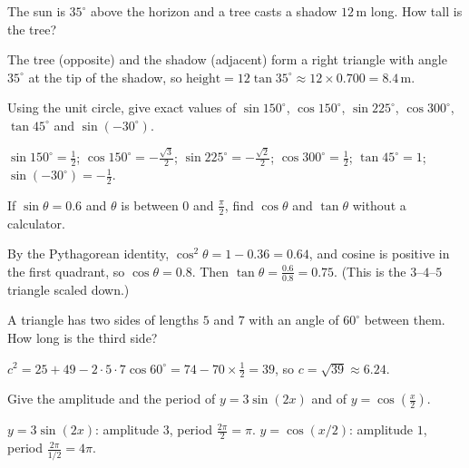 \begin{exercise}
The sun is $35^\circ$ above the horizon and a tree casts a shadow $12$\,m long.
How tall is the tree?
\end{exercise}
\begin{solution}
The tree (opposite) and the shadow (adjacent) form a right triangle with angle
$35^\circ$ at the tip of the shadow, so $\text{height} = 12\tan35^\circ \approx
12 \times 0.700 = 8.4$\,m.
\end{solution}

\begin{exercise}
Using the unit circle, give exact values of $\sin150^\circ$, $\cos150^\circ$,
$\sin225^\circ$, $\cos300^\circ$, $\tan45^\circ$ and $\sin(-30^\circ)$.
\end{exercise}
\begin{solution}
$\sin150^\circ = \tfrac12$; $\cos150^\circ = -\tfrac{\sqrt3}{2}$;
$\sin225^\circ = -\tfrac{\sqrt2}{2}$; $\cos300^\circ = \tfrac12$;
$\tan45^\circ = 1$; $\sin(-30^\circ) = -\tfrac12$.
\end{solution}

\begin{exercise}
If $\sin\theta = 0.6$ and $\theta$ is between $0$ and $\tfrac{\pi}{2}$, find
$\cos\theta$ and $\tan\theta$ without a calculator.
\end{exercise}
\begin{solution}
By the Pythagorean identity, $\cos^2\theta = 1 - 0.36 = 0.64$, and cosine is
positive in the first quadrant, so $\cos\theta = 0.8$. Then
$\tan\theta = \tfrac{0.6}{0.8} = 0.75$. (This is the $3$--$4$--$5$ triangle
scaled down.)
\end{solution}

\begin{exercise}
A triangle has two sides of lengths $5$ and $7$ with an angle of $60^\circ$
between them. How long is the third side?
\end{exercise}
\begin{solution}
$c^2 = 25 + 49 - 2\cdot5\cdot7\cos60^\circ = 74 - 70\times\tfrac12 = 39$, so
$c = \sqrt{39} \approx 6.24$.
\end{solution}

\begin{exercise}
Give the amplitude and the period of $y = 3\sin(2x)$ and of
$y = \cos\left(\tfrac{x}{2}\right)$.
\end{exercise}
\begin{solution}
$y = 3\sin(2x)$: amplitude $3$, period $\tfrac{2\pi}{2} = \pi$.
$y = \cos(x/2)$: amplitude $1$, period $\tfrac{2\pi}{1/2} = 4\pi$.
\end{solution}

